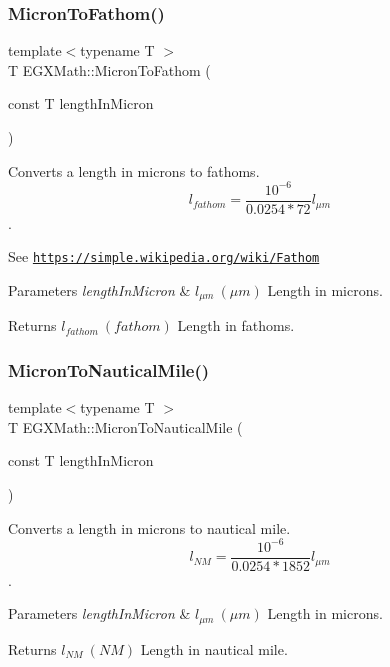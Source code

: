 \subsubsection{\texorpdfstring{Micron\+To\+Fathom()}{MicronToFathom()}}
{\footnotesize\ttfamily template$<$typename T $>$ \\
T E\+G\+X\+Math\+::\+Micron\+To\+Fathom (\begin{DoxyParamCaption}\item[{const T}]{length\+In\+Micron }\end{DoxyParamCaption})}



Converts a length in microns to fathoms. \[ l_{fathom}= \frac{10^{-6}}{0.0254 * 72} l_{\mu m} \]. 

See \href{https://simple.wikipedia.org/wiki/Fathom}{\tt https\+://simple.\+wikipedia.\+org/wiki/\+Fathom} 
\begin{DoxyParams}{Parameters}
{\em length\+In\+Micron} & $ l_{\mu m}\ (\mu m)$ Length in microns. \\
\hline
\end{DoxyParams}
\begin{DoxyReturn}{Returns}
$ l_{fathom}\ (fathom)$ Length in fathoms. 
\end{DoxyReturn}
\mbox{\label{group___e_g_x_math-_conversions-_length_conversions-_non-_s_i-_micron-_nautical_gaa3944ed4bca9dcd37c3043d44cc36bf1}} 
\subsubsection{\texorpdfstring{Micron\+To\+Nautical\+Mile()}{MicronToNauticalMile()}}
{\footnotesize\ttfamily template$<$typename T $>$ \\
T E\+G\+X\+Math\+::\+Micron\+To\+Nautical\+Mile (\begin{DoxyParamCaption}\item[{const T}]{length\+In\+Micron }\end{DoxyParamCaption})}



Converts a length in microns to nautical mile. \[ l_{NM}= \frac{10^{-6}}{0.0254 * 1852} l_{\mu m} \]. 


\begin{DoxyParams}{Parameters}
{\em length\+In\+Micron} & $ l_{\mu m}\ (\mu m)$ Length in microns. \\
\hline
\end{DoxyParams}
\begin{DoxyReturn}{Returns}
$ l_{NM}\ (NM)$ Length in nautical mile. 
\end{DoxyReturn}
